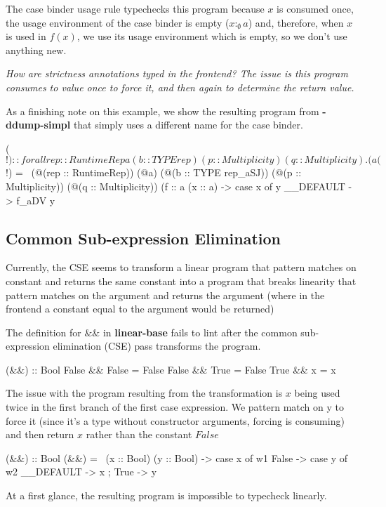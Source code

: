 \documentclass[]{lwnovathesis}
\begin{document}
%
The case binder usage rule typechecks this program because $x$ is consumed once,
the usage environment of the case binder is empty ($x :_\emptyset a$) and,
therefore, when $x$ is used in $f(x)$, we use its usage environment which is
empty, so we don't use anything new.

\emph{How are strictness annotations typed in the frontend? The issue is this program
consumes to value once to force it, and then again to determine the return
value.}


As a finishing note on this example, we show the resulting program from
\textbf{-ddump-simpl} that simply uses a different name for the case binder.
\begin{code}
($!)
  :: forall {rep :: RuntimeRep} a (b :: TYPE rep)
            (p :: Multiplicity) (q :: Multiplicity).
     (a %
($!)
  = \ (@(rep :: RuntimeRep))
      (@a)
      (@(b :: TYPE rep_aSJ))
      (@(p :: Multiplicity))
      (@(q :: Multiplicity))
      (f :: a %
      (x :: a) ->
      case x of y { __DEFAULT -> f_aDV y }
\end{code}

\subsection{Common Sub-expression Elimination}

Currently, the CSE seems to transform a linear program that pattern matches on
constant and returns the same constant into a program that breaks linearity that
pattern matches on the argument and returns the argument (where in the frontend
a constant equal to the argument would be returned)

The definition for $\&\&$ in \textbf{linear-base} fails to lint after the common
sub-expression elimination (CSE) pass transforms the program.
\begin{code}
(&&) :: Bool %
False && False = False
False && True = False
True && x = x
\end{code}
The issue with the program resulting from the transformation is $x$ being used
twice in the first branch of the first case expression. We pattern match on y to
force it (since it's a type without constructor arguments, forcing is consuming)
and then return $x$ rather than the constant $False$
\begin{code}
(&&) :: Bool %
(&&) = \ (x :: Bool) (y :: Bool) ->
  case x of w1 {
    False -> case y of w2 { __DEFAULT -> x };
    True -> y
  }
\end{code}
At a first glance, the resulting program is impossible to typecheck linearly.
\end{document}
